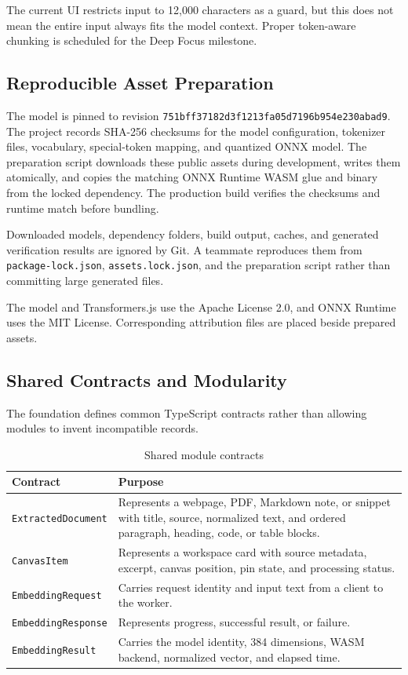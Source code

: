 \documentclass{tietreport}
\begin{document}
The current UI restricts input to 12,000 characters as a guard, but this does not mean the
entire input always fits the model context. Proper token-aware chunking is scheduled for the
Deep Focus milestone.

\subsection{Reproducible Asset Preparation}

The model is pinned to revision
\texttt{751bff37182d3f1213fa05d7196b954e230abad9}. The project records SHA-256 checksums for
the model configuration, tokenizer files, vocabulary, special-token mapping, and quantized
ONNX model. The preparation script downloads these public assets during development, writes
them atomically, and copies the matching ONNX Runtime WASM glue and binary from the locked
dependency. The production build verifies the checksums and runtime match before bundling.

Downloaded models, dependency folders, build output, caches, and generated verification
results are ignored by Git. A teammate reproduces them from \texttt{package-lock.json},
\texttt{assets.lock.json}, and the preparation script rather than committing large generated
files.

The model and Transformers.js use the Apache License 2.0, and ONNX Runtime uses the MIT
License. Corresponding attribution files are placed beside prepared assets.

\subsection{Shared Contracts and Modularity}

The foundation defines common TypeScript contracts rather than allowing modules to invent
incompatible records.

\begin{table}[htbp]
\centering
\small
\begin{tabularx}{\textwidth}{@{}p{}Y@{}}
\toprule
\textbf{Contract} & \textbf{Purpose} \\
\midrule
\texttt{ExtractedDocument} & Represents a webpage, PDF, Markdown note, or snippet with title,
source, normalized text, and ordered paragraph, heading, code, or table blocks. \\
\texttt{CanvasItem} & Represents a workspace card with source metadata, excerpt, canvas
position, pin state, and processing status. \\
\texttt{EmbeddingRequest} & Carries request identity and input text from a client to the worker. \\
\texttt{EmbeddingResponse} & Represents progress, successful result, or failure. \\
\texttt{EmbeddingResult} & Carries the model identity, 384 dimensions, WASM backend,
normalized vector, and elapsed time. \\
\bottomrule
\end{tabularx}
\caption{Shared module contracts}
\label{tab:contracts}
\end{table}
\end{document}

